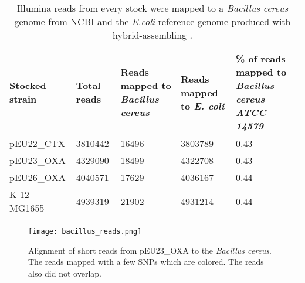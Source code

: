 \begin{table}[H]
	\begin{tabularx}{\linewidth}{|LLLLL|}
		\hline
		Stocked strain    & Total reads & Reads mapped to \textit{Bacillus cereus} & Reads mapped to \textit{E. coli} & \% of reads mapped to \textit{Bacillus cereus ATCC 14579} \\ \hline
		pEU22\_CTX & 3810442     & 16496                                                     & 3803789                                           & 0.43                                                            \\ \hline
		pEU23\_OXA & 4329090     & 18499                                                     & 4322708                                           & 0.43                                                            \\ \hline
		pEU26\_OXA & 4040571     & 17629                                                     & 4036167                                           & 0.44                                                            \\ \hline
		K-12 MG1655      & 4939319     & 21902                                                     & 4931214                                           & 0.44                                                            \\ \hline
	\end{tabularx}
	\caption{Illumina reads from every stock were mapped to a \textit{Bacillus cereus} genome from NCBI and the \textit{E.coli} reference genome produced with  hybrid-assembling \cite{noauthor_bacillus_nodate}.}
	\label{table:bacillus_reads}
\end{table}
\begin{figure}
\texttt{[image: bacillus\_reads.png]}
\caption{Alignment of short reads from pEU23\_OXA to the \textit{Bacillus cereus}. The reads mapped with a few SNPs which are colored. The reads also did not overlap.}
\label{figure:bacillus_reads}
\end{figure}
